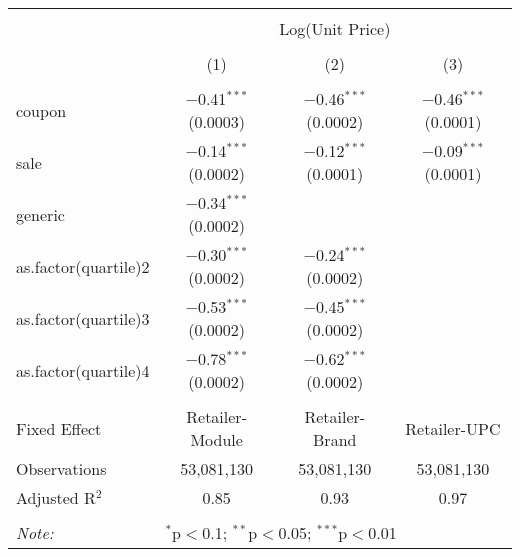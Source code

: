
\begin{table}[!htbp] \centering 
  \caption{} 
  \label{tab:overallSavings} 
\begin{tabular}{@{\extracolsep{5pt}}lccc} 
\\[-1.8ex]\hline 
\hline \\[-1.8ex] 
 & \multicolumn{3}{c}{Log(Unit Price)} \\ 
\\[-1.8ex] & (1) & (2) & (3)\\ 
\hline \\[-1.8ex] 
 coupon & $-$0.41$^{***}$ (0.0003) & $-$0.46$^{***}$ (0.0002) & $-$0.46$^{***}$ (0.0001) \\ 
  sale & $-$0.14$^{***}$ (0.0002) & $-$0.12$^{***}$ (0.0001) & $-$0.09$^{***}$ (0.0001) \\ 
  generic & $-$0.34$^{***}$ (0.0002) &  &  \\ 
  as.factor(quartile)2 & $-$0.30$^{***}$ (0.0002) & $-$0.24$^{***}$ (0.0002) &  \\ 
  as.factor(quartile)3 & $-$0.53$^{***}$ (0.0002) & $-$0.45$^{***}$ (0.0002) &  \\ 
  as.factor(quartile)4 & $-$0.78$^{***}$ (0.0002) & $-$0.62$^{***}$ (0.0002) &  \\ 
 \hline \\[-1.8ex] 
Fixed Effect & Retailer-Module & Retailer-Brand & Retailer-UPC \\ 
Observations & 53,081,130 & 53,081,130 & 53,081,130 \\ 
Adjusted R$^{2}$ & 0.85 & 0.93 & 0.97 \\ 
\hline 
\hline \\[-1.8ex] 
\textit{Note:}  & \multicolumn{3}{l}{$^{*}$p$<$0.1; $^{**}$p$<$0.05; $^{***}$p$<$0.01} \\ 
\end{tabular} 
\end{table} 
